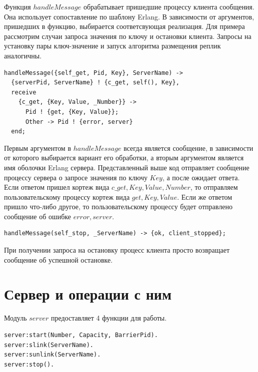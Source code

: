 		Функция $handleMessage$ обрабатывает пришедшие процессу клиента сообщения. Она использует сопоставление по шаблону Erlang. В зависимости от аргументов, пришедших в функцию,
		выбирается соответсвующая реализация. Для примера рассмотрим случаи запроса значения по ключу и остановки клиента. Запросы на установку пары ключ-значение и запуск
		алгоритма размещения реплик аналогичны.
		\begin{lstlisting}
handleMessage({self_get, Pid, Key}, ServerName) ->
  {serverPid, ServerName} ! {c_get, self(), Key},
  receive
    {c_get, {Key, Value, _Number}} ->
      Pid ! {get, {Key, Value}};
      Other -> Pid ! {error, server}
  end;
		\end{lstlisting} 
		Первым аргументом в $handleMessage$ всегда является сообщение, в зависимости от которого выбирается вариант его обработки, а вторым аргументом является имя оболочки 
		Erlang сервера. Представленный выше код отправляет сообщение процессу сервера о запросе значения по ключу $Key$, а после ожидает ответа. Если ответом пришел кортеж вида
		${c\_get, {Key, Value, Number}}$, то отправляем пользовательскому процессу кортеж вида ${get, {Key, Value}}$. Если же ответом пришло что-либо другое, то пользовательскому 
		процессу будет отправлено сообщение об ошибке ${error, server}$. 

		\begin{lstlisting}
handleMessage(self_stop, _ServerName) -> {ok, client_stopped};			
		\end{lstlisting}
		При получении запроса на остановку процесс клиента просто возвращает сообщение об успешной остановке.

	\section{Сервер и операции с ним}
		Модуль $server$ предоставляет 4 функции для работы.
		\begin{lstlisting}
server:start(Number, Capacity, BarrierPid).
server:slink(ServerName).
server:sunlink(ServerName).
server:stop().			
		\end{lstlisting}

